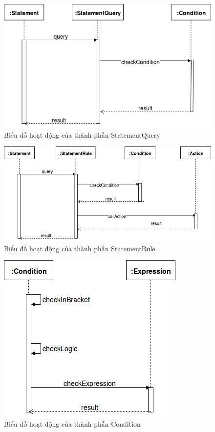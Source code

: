 \begin{figure}[h!]
	\center
	\includegraphics[scale=0.4]{image/language_diagram-statement_query}	
	\caption{Biểu đồ hoạt động của thành phần StatementQuery}
\end{figure}


\begin{figure}[h!]
	\center
	\includegraphics[scale=0.4]{image/language_diagram-statement_rule}	
	\caption{Biểu đồ hoạt động của thành phần StatementRule}
\end{figure}


\begin{figure}[h!]
	\center
	\includegraphics[scale=0.4]{image/language_diagram-condition}	
	\caption{Biểu đồ hoạt động của thành phần Condition}
\end{figure}



